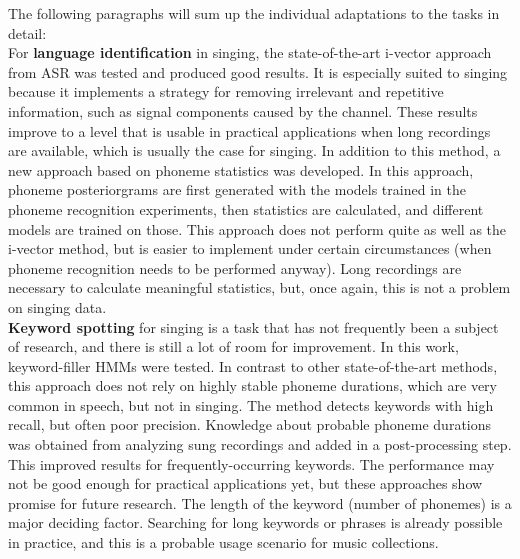 The following paragraphs will sum up the individual adaptations to the tasks in detail:\\

For \textbf{language identification} in singing, the state-of-the-art i-vector approach from ASR was tested and produced good results. It is especially suited to singing because it implements a strategy for removing irrelevant and repetitive information, such as signal components caused by the channel. These results improve to a level that is usable in practical applications when long recordings are available, which is usually the case for singing. In addition to this method, a new approach based on phoneme statistics was developed. In this approach, phoneme posteriorgrams are first generated with the models trained in the phoneme recognition experiments, then statistics are calculated, and different models are trained on those. This approach does not perform quite as well as the i-vector method, but is easier to implement under certain circumstances (when phoneme recognition needs to be performed anyway). Long recordings are necessary to calculate meaningful statistics, but, once again, this is not a problem on singing data.\\

\textbf{Keyword spotting} for singing is a task that has not frequently been a subject of research, and there is still a lot of room for improvement. In this work, keyword-filler HMMs were tested. In contrast to other state-of-the-art methods, this approach does not rely on highly stable phoneme durations, which are very common in speech, but not in singing. The method detects keywords with high recall, but often poor precision. Knowledge about probable phoneme durations was obtained from analyzing sung recordings and added in a post-processing step. This improved results for frequently-occurring keywords. The performance may not be good enough for practical applications yet, but these approaches show promise for future research. The length of the keyword (number of phonemes) is a major deciding factor. Searching for long keywords or phrases is already possible in practice, and this is a probable usage scenario for music collections.\\

